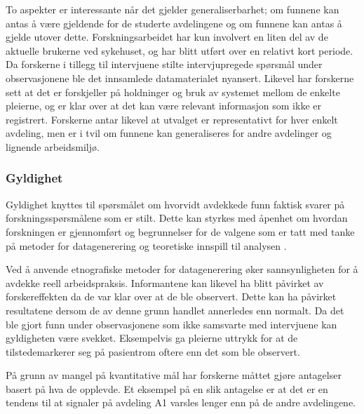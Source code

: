 \noindent
To aspekter er interessante når det gjelder generaliserbarhet; om funnene kan antas å være gjeldende for de studerte avdelingene og om funnene kan antas å gjelde utover dette.  Forskningsarbeidet har kun involvert en liten del av de aktuelle brukerne ved sykehuset, og har blitt utført over en relativt kort periode. Da forskerne i tillegg til intervjuene stilte intervjupregede spørsmål under observasjonene ble det innsamlede datamaterialet nyansert. Likevel har forskerne sett at det er forskjeller på holdninger og bruk av systemet mellom de enkelte pleierne, og er klar over at det kan være relevant informasjon som ikke er registrert. Forskerne antar likevel at utvalget er representativt for hver enkelt avdeling, men er i tvil om funnene kan generaliseres for andre avdelinger og lignende arbeidsmiljø. 

\subsubsection{Gyldighet}
Gyldighet knyttes til spørsmålet om hvorvidt avdekkede funn faktisk svarer på forskningsspørsmålene som er stilt. Dette kan styrkes med åpenhet om hvordan forskningen er gjennomført og begrunnelser for de valgene som er tatt med tanke på metoder for datagenerering og teoretiske innspill til analysen \citep{Tjora}. 

\noindent
Ved å anvende etnografiske metoder for datagenerering øker sannsynligheten for å avdekke reell arbeidspraksis. Informantene kan likevel ha blitt påvirket av forskereffekten da de var klar over at de ble observert. Dette kan ha påvirket resultatene dersom de av denne grunn handlet annerledes enn normalt. Da det ble gjort funn under observasjonene som ikke samsvarte med intervjuene kan gyldigheten være svekket. Eksempelvis ga pleierne uttrykk for at de tilstedemarkerer seg på pasientrom oftere enn det som ble observert.

\noindent
På grunn av mangel på kvantitative mål har forskerne måttet gjøre antagelser basert på hva de opplevde. Et eksempel på en slik antagelse er at det er en tendens til at signaler på avdeling A1 varsles lenger enn på de andre avdelingene.
